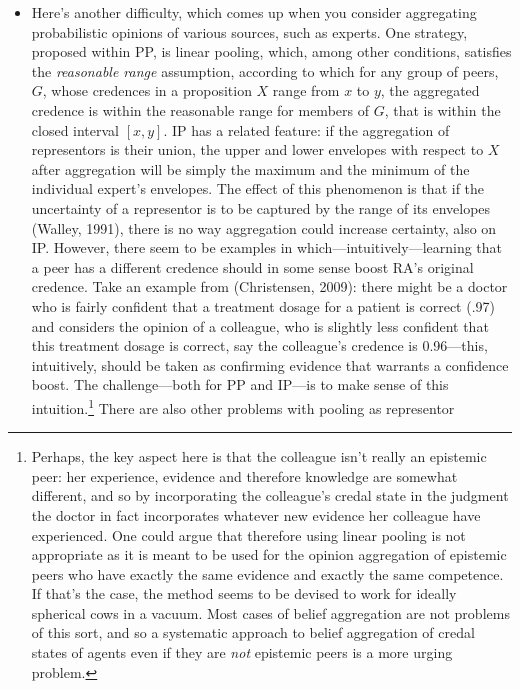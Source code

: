\documentclass[
  10pt,
  dvipsnames,enabledeprecatedfontcommands]{scrartcl}
\begin{document}
\begin{itemize}
\item
  Here's another difficulty, which comes up when you consider
  aggregating probabilistic opinions of various sources, such as
  experts. One strategy, proposed within PP, is linear pooling, which,
  among other conditions, satisfies the \emph{reasonable  range}
  assumption, according to which for any group of peers, \(G\), whose
  credences in a proposition \(X\) range from \(x\) to \(y\), the
  aggregated credence is within the reasonable range for members of
  \(G\), that is within the closed interval \([x, y]\). IP has a related
  feature: if the aggregation of representors is their union, the upper
  and lower envelopes with respect to \(X\) after aggregation will be
  simply the maximum and the minimum of the individual expert's
  envelopes. The effect of this phenomenon is that if the uncertainty of
  a representor is to be captured by the range of its envelopes (Walley,
  1991), there is no way aggregation could increase certainty, also on
  IP. However, there seem to be examples in
  which---intuitively---learning that a peer has a different credence
  should in some sense boost RA's original credence. Take an example
  from (Christensen, 2009): there might be a doctor who is fairly
  confident that a treatment dosage for a patient is correct (.97) and
  considers the opinion of a colleague, who is slightly less confident
  that this treatment dosage is correct, say the colleague's credence is
  0.96---this, intuitively, should be taken as confirming evidence that
  warrants a confidence boost. The challenge---both for PP and IP---is
  to make sense of this intuition.\footnote{Perhaps, the key aspect here
    is that the colleague isn't really an epistemic peer: her
    experience, evidence and therefore knowledge are somewhat different,
    and so by incorporating the colleague's credal state in the judgment
    the doctor in fact incorporates whatever new evidence her colleague
    have experienced. One could argue that therefore using linear
    pooling is not appropriate as it is meant to be used for the opinion
    aggregation of epistemic peers who have exactly the same evidence
    and exactly the same competence. If that's the case, the method
    seems to be devised to work for ideally spherical cows in a vacuum.
    Most cases of belief aggregation are not problems of this sort, and
    so a systematic approach to belief aggregation of credal states of
    agents even if they are \emph{not} epistemic peers is a more urging
    problem.} There are also other problems with pooling as representor

\end{itemize}
\end{document}

